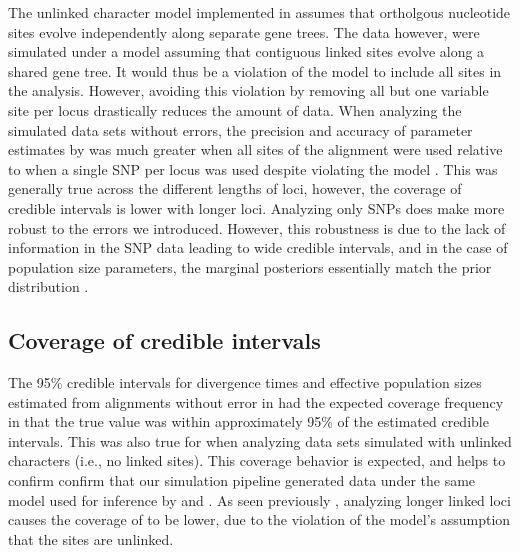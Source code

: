 The unlinked character model implemented in \ecoevolity assumes that ortholgous 
nucleotide sites evolve independently along separate gene trees. The data however, were
simulated under a model assuming that contiguous linked sites evolve along a shared 
gene tree. It would thus be a violation of the \ecoevolity model to include all
sites in the analysis.
However, avoiding this violation by removing all but one variable site per
locus drastically reduces the amount of data.
When analyzing the simulated data sets without errors, the precision and accuracy of
parameter estimates by \ecoevolity was much greater
when all sites of the alignment were used relative to when a single SNP per 
locus was used despite violating the model \mainfigsp.
This was generally true across the different lengths of loci, however, the
coverage of credible intervals is lower with longer loci.
Analyzing only SNPs does make \ecoevolity more robust to the errors
we introduced.
However, this robustness is due to the lack of information in the
SNP data leading to wide credible intervals, and in the case of
population size parameters, the marginal posteriors essentially
match the prior distribution \thetafigsp.





\subsection{Coverage of credible intervals}
The 95\% credible intervals for divergence times and effective population sizes
estimated from alignments without error in \beast had the expected coverage
frequency in that the true value was within approximately 95\% of the estimated
credible intervals. 
This was also true for \ecoevolity when analyzing data sets simulated with
unlinked characters (i.e., no linked sites).
This coverage behavior is expected, and helps to confirm confirm that our
simulation pipeline generated data under the same model used for inference by
\beast and \ecoevolity. 
As seen previously \citep{oaksFullBayesianComparative2019}, analyzing longer linked loci
causes the coverage of \ecoevolity to be lower, due to the violation of the
model's assumption that the sites are unlinked.


